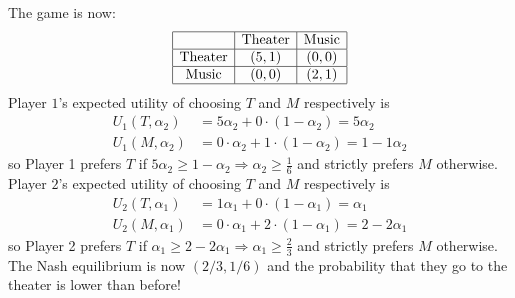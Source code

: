 \documentclass[10pt]{article}
\begin{document}
\begin{example}
	The game is now:
	\[
	\begin{array}{|c|c|c|}
		\hline
		& \text{Theater} & \text{Music} \\\hline
		\text{Theater} & (5,1) & (0,0) \\\hline 
		\text{Music} & (0,0) & (2,1) \\\hline
	\end{array}
	\]
	Player $1$'s expected utility of choosing $T$ and $M$ respectively is \begin{align*} U_1(T,\alpha_2) &= 5\alpha_2 + 0 \cdot (1-\alpha_2) = 5\alpha_2 \\ U_1(M,\alpha_2) &= 0 \cdot \alpha_2 + 1\cdot (1-\alpha_2) = 1 - 1\alpha_2 \end{align*} so Player 1 prefers $T$ if $5\alpha_2 \ge 1-\alpha_2 \Longrightarrow \alpha_2 \ge \frac{1}{6}$ and strictly prefers $M$ otherwise. Player $2$'s expected utility of choosing $T$ and $M$ respectively is \begin{align*} U_2(T,\alpha_1) &= 1\alpha_1 + 0 \cdot (1-\alpha_1) = \alpha_1 \\ U_2(M,\alpha_1) &= 0 \cdot \alpha_1 + 2\cdot (1-\alpha_1) = 2 - 2\alpha_1 \end{align*} so Player 2 prefers $T$ if $\alpha_1 \ge 2-2\alpha_1 \Longrightarrow \alpha_1 \ge \frac{2}{3}$ and strictly prefers $M$ otherwise. The Nash equilibrium is now $(2/3,1/6)$ and the probability that they go to the theater is lower than before!
\end{example}
\end{document}
